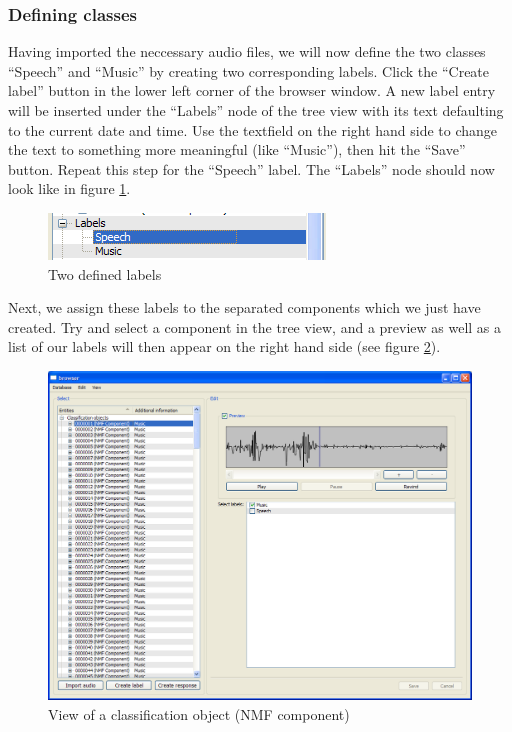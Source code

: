 \subsubsection{Defining classes}

Having imported the neccessary audio files, we will now define the two classes
``Speech'' and ``Music'' by creating two corresponding labels. Click the
``Create label'' button in the lower left corner of the browser window. A new
label entry will be inserted under the ``Labels'' node of the tree view with its
text defaulting to the current date and time. Use the textfield on the right
hand side to change the text to something more meaningful (like ``Music''), then
hit the ``Save'' button. Repeat this step for the ``Speech'' label. The
``Labels'' node should now look like in figure \ref{figure:TutorialLabels}.

\begin{figure}
    \centering
    \includegraphics[width=.5\textwidth]{tutorial-media/Labels.png}
    \caption{%
        \label{figure:TutorialLabels}%
        Two defined labels
    }
\end{figure}

Next, we assign these labels to the separated components which we just have
created. Try and select a component in the tree view, and a preview as well as a
list of our labels will then appear on the right hand side (see figure
\ref{figure:TutorialClassificationObjectView}).

\begin{figure}
    \centering
    \includegraphics[width=\textwidth]{tutorial-media/ClassificationObjectView.png}
    \caption{%
        \label{figure:TutorialClassificationObjectView}%
        View of a classification object (NMF component)
    }
\end{figure}

